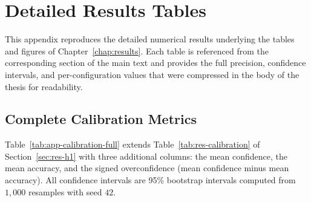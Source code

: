 
\chapter{Detailed Results Tables}
\label{app:tables}

This appendix reproduces the detailed numerical results underlying the 
tables and figures of Chapter~\ref{chap:results}. Each table is 
referenced from the corresponding section of the main text and 
provides the full precision, confidence intervals, and per-configuration 
values that were compressed in the body of the thesis for readability.

\section{Complete Calibration Metrics}
\label{sec:app-calibration-full}

Table~\ref{tab:app-calibration-full} extends 
Table~\ref{tab:res-calibration} of Section~\ref{sec:res-h1} with three 
additional columns: the mean confidence, the mean accuracy, and the 
signed overconfidence (mean confidence minus mean accuracy). All 
confidence intervals are 95\% bootstrap intervals computed from 
$1{,}000$ resamples with seed $42$.

